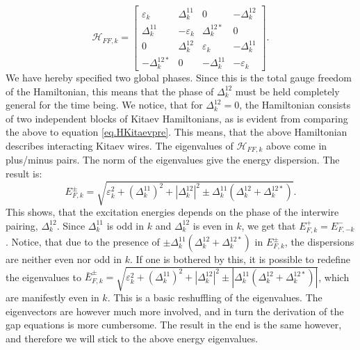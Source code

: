 \begin{equation}
\mathcal{H}_{FF,k} = \begin{bmatrix} \varepsilon_{k}   & \Delta^{11}_k      & 0                 & -\Delta^{12}_{k} \\ 
                                     \Delta^{11}_k     & -\varepsilon_{k}   & \Delta^{12*}_k    & 0 \\ 
                                    0                  & \Delta^{12}_k      & \varepsilon_{k}   & -\Delta^{11}_k \\ 
                                     -\Delta^{12*}_{k} & 0                  & -\Delta^{11}_k     & -\varepsilon_{k} \end{bmatrix}.                  
\end{equation}
We have hereby specified two global phases. Since this is the total gauge freedom of the Hamiltonian, this means that the phase of $\Delta^{12}_k$ must be held completely general for the time being. We notice, that for $\Delta^{12}_{k} = 0$, the Hamiltonian consists of two independent blocks of Kitaev Hamiltonians, as is evident from comparing the above to equation \ref{eq.HKitaevpre}. This means, that the above Hamiltonian describes interacting Kitaev wires. The eigenvalues of $\mathcal{H}_{FF,k}$ above come in plus/minus pairs. The norm of the eigenvalues give the energy dispersion. The result is:
\begin{equation}
E^{\pm}_{F,k} = \sqrt{\varepsilon^2_k + \left(\Delta^{11}_k\right)^2 + \left|\Delta^{12}_k\right|^2 \pm \Delta^{11}_k(\Delta^{12}_k + \Delta^{12*}_k)}. 
\end{equation} 
This shows, that the excitation energies depends on the phase of the interwire pairing, $\Delta^{12}_k$. Since $\Delta^{11}_k$ is odd in $k$ and $\Delta^{12}_k$ is even in $k$, we get that $E^{+}_{F,k} = E^{-}_{F,-k}$. Notice, that due to the presence of $\pm \Delta^{11}_k(\Delta^{12}_k + \Delta^{12*}_k)$ in $E^{\pm}_{F,k}$, the dispersions are neither even nor odd in $k$. If one is bothered by this, it is possible to redefine the eigenvalues to $\bar{E}^{\pm}_{F,k} = \sqrt{\varepsilon^2_k + \left(\Delta^{11}_k\right)^2 + \left|\Delta^{12}_k\right|^2 \pm |\Delta^{11}_k(\Delta^{12}_k + \Delta^{12*}_k)|}$, which are manifestly even in $k$. This is a basic reshuffling of the eigenvalues. The eigenvectors are however much more involved, and in turn the derivation of the gap equations is more cumbersome. The result in the end is the same however, and therefore we will stick to the above energy eigenvalues.  

